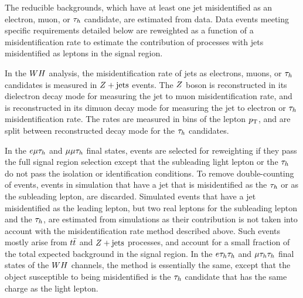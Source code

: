 The reducible backgrounds, which have at least one jet misidentified as an electron, 
muon, or $\tau_{h}$ candidate, are estimated from data. 
Data events meeting specific requirements detailed below are reweighted 
as a function of a misidentification rate to estimate the 
contribution of processes with jets misidentified as leptons in the signal region. 

In the $WH$ analysis, the misidentification rate of jets as electrons, muons, 
or $\tau_{h}$ candidates is measured in $Z+\textrm{jets}$ events. The $Z$ boson is reconstructed 
in its dielectron decay mode for measuring the jet to muon  misidentification
rate, and is reconstructed in its dimuon decay mode for measuring the jet to electron
or $\tau_{h}$ misidentification rate.
The rates are measured in bins of the lepton $p_\mathrm{T}$, and are 
split between reconstructed decay mode for the $\tau_{h}$ candidates. 

In the $e\mu\tau_{h}$ and $\mu\mu\tau_{h}$ final states, 
events are selected for reweighting if they pass the full signal region 
selection except that the subleading light lepton or the $\tau_{h}$ do not 
pass the isolation or identification conditions.
To remove double-counting of events, events in simulation that have a jet that is 
misidentified as the $\tau_{h}$ or as the subleading lepton, are discarded. Simulated 
events that have a jet misidentified as the leading lepton, but two real leptons 
for the subleading lepton and the $\tau_{h}$, are estimated from simulations as their 
contribution is not taken into account with the misidentification rate method 
described above. Such events mostly arise from $t\bar{t}$ and $Z+\textrm{jets}$ processes, 
and account for a small fraction of the total expected background in the signal region. 
In the $e\tau_{h}\tau_{h}$ and $\mu\tau_{h}\tau_{h}$ final states of the $WH$ channels, 
the method is essentially the same, except that the object susceptible to being misidentified 
is the $\tau_{h}$ candidate that has the same charge as the light lepton.  

